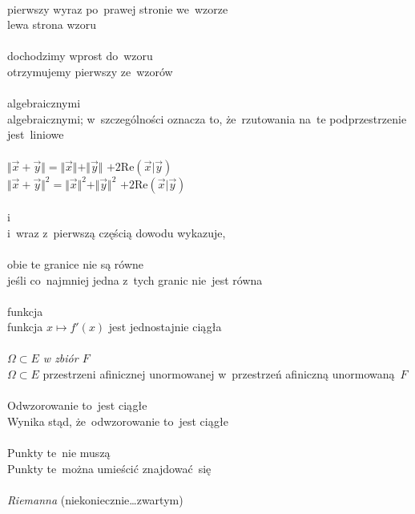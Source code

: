 \documentclass[a4paper,11pt]{article}
\begin{document}
 \\
\Jest pierwszy wyraz po~prawej stronie we~wzorze \\
\Powin  lewa strona wzoru \\
 \\
\Jest dochodzimy wprost do~wzoru \\
\Powin  otrzymujemy pierwszy ze~wzorów \\
 \\
\Jest algebraicznymi \\
\Powin algebraicznymi; w~szczególności oznacza to, że~rzutowania na~te
podprzestrzenie jest~liniowe \\
 \\
\Jest
$\Vert \vec{ x } + \vec{ y } \Vert = \Vert \vec{ x } \Vert + \Vert \vec{ y } \Vert$
$+ 2 \mathrm{Re}( \vec{ x } | \vec{ y } )$ \\
\Powin $\Vert \vec{ x } + \vec{ y } \Vert^{ 2 } = \Vert \vec{ x } \Vert^{ 2 }
+ \Vert \vec{ y } \Vert^{ 2 }$ $+ 2 \mathrm{Re}( \vec{ x } | \vec{ y } )$ \\
 \\
\Jest i \\
\Powin i~wraz z~pierwszą częścią dowodu wykazuje, \\
 \\
\Jest obie te granice nie są równe \\
\Powin  jeśli co~najmniej jedna z~tych granic nie~jest równa \\
 \\
\Jest funkcja \\
\Powin  funkcja $x \mapsto f'( x )$ jest jednostajnie ciągła \\
 \\
\Jest \textit{$\Omega \subset E$ w zbiór $F$} \\
\Powin $\Omega \subset E$ przestrzeni afinicznej unormowanej
w~przestrzeń afiniczną unormowaną~$F$ \\
 \\
\Jest Odwzorowanie to~jest ciągłe \\
\Powin  Wynika stąd, że~odwzorowanie to~jest ciągłe \\
 \\
\Jest Punkty te~nie muszą \\
\Powin  Punkty te~można umieścić znajdować~się \\
 \\
\Jest  \emph{Riemanna} (niekoniecznie\ldots zwartym) \\
\end{document}

